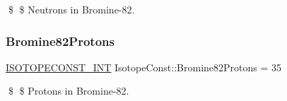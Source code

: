 \$ \$ Neutrons in Bromine-\/82. \mbox{\label{group___isotope_const-_bromine-_br82_gad7f2aca748f950a013bf96e67df2bdd7}} 
\subsubsection{\texorpdfstring{Bromine82\+Protons}{Bromine82Protons}}
{\footnotesize\ttfamily \mbox{\hyperlink{group___isotope_const-_macros_ga5f18360b3e99483a35c32d789e62621c}{I\+S\+O\+T\+O\+P\+E\+C\+O\+N\+S\+T\+\_\+\+I\+NT}} Isotope\+Const\+::\+Bromine82\+Protons = 35}

\$ \$ Protons in Bromine-\/82. 